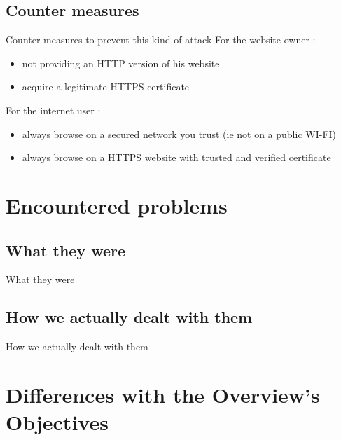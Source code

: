 \documentclass{beamer}
\begin{document}
\subsection{Counter measures}
\begin{frame}{Counter measures to prevent this kind of attack}
For the website owner : \\
	\begin{itemize}
		\pause \item not providing an HTTP version of his website\\
		\pause \item acquire a legitimate HTTPS certificate\\
	\end{itemize}
\pause For the internet user : \\
	\begin{itemize}
		\pause \item always browse on a secured network you trust (ie not on a public WI-FI)\\
		\pause \item always browse on a HTTPS website with trusted and verified certificate\\
	\end{itemize}
\end{frame}

\section{Encountered problems}

\subsection{What they were}
\begin{frame}{What they were}

\end{frame}

\subsection{How we actually dealt with them}
\begin{frame}{How we actually dealt with them}

\end{frame}

\section{Differences with the Overview's Objectives}
\end{document}
